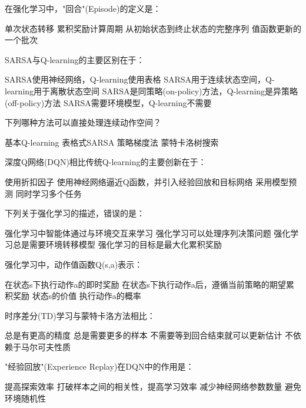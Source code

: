 \documentclass[zihao=5,answers]{BHCexam}
\begin{document}
\begin{questions}
\question 在强化学习中，"回合"(Episode)的定义是：
\begin{choices}
    \choice 单次状态转移
    \choice 累积奖励计算周期
    \CorrectChoice 从初始状态到终止状态的完整序列
    \choice 值函数更新的一个批次
\end{choices}

\question SARSA与Q-learning的主要区别在于：
\begin{choices}
    \choice SARSA使用神经网络，Q-learning使用表格
    \choice SARSA用于连续状态空间，Q-learning用于离散状态空间
    \CorrectChoice SARSA是同策略(on-policy)方法，Q-learning是异策略(off-policy)方法
    \choice SARSA需要环境模型，Q-learning不需要
\end{choices}

\question 下列哪种方法可以直接处理连续动作空间？
\begin{choices}
    \choice 基本Q-learning
    \choice 表格式SARSA
    \CorrectChoice 策略梯度法
    \choice 蒙特卡洛树搜索
\end{choices}

\question 深度Q网络(DQN)相比传统Q-learning的主要创新在于：
\begin{choices}
    \choice 使用折扣因子
    \CorrectChoice 使用神经网络逼近Q函数，并引入经验回放和目标网络
    \choice 采用模型预测
    \choice 同时学习多个任务
\end{choices}

\question 下列关于强化学习的描述，错误的是：
\begin{choices}
    \choice 强化学习中智能体通过与环境交互来学习
    \choice 强化学习可以处理序列决策问题
    \CorrectChoice 强化学习总是需要环境转移模型
    \choice 强化学习的目标是最大化累积奖励
\end{choices}

\question 强化学习中，动作值函数Q(s,a)表示：
\begin{choices}
    \choice 在状态s下执行动作a的即时奖励
    \CorrectChoice 在状态s下执行动作a后，遵循当前策略的期望累积奖励
    \choice 状态s的价值
    \choice 执行动作a的概率
\end{choices}

\question 时序差分(TD)学习与蒙特卡洛方法相比：
\begin{choices}
    \choice 总是有更高的精度
    \choice 总是需要更多的样本
    \CorrectChoice 不需要等到回合结束就可以更新估计
    \choice 不依赖于马尔可夫性质
\end{choices}

\question "经验回放"(Experience Replay)在DQN中的作用是：
\begin{choices}
    \choice 提高探索效率
    \CorrectChoice 打破样本之间的相关性，提高学习效率
    \choice 减少神经网络参数数量
    \choice 避免环境随机性
\end{choices}


\end{questions}
\end{document}
